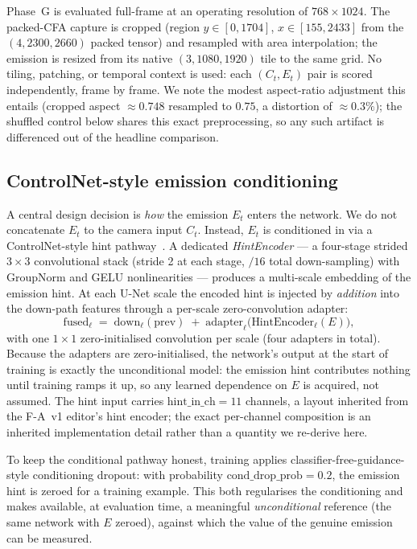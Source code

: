 Phase~G is evaluated full-frame at an operating resolution of $768\times1024$. The packed-CFA capture is cropped (region $y\in[0,1704]$, $x\in[155,2433]$ from the $(4,2300,2660)$ packed tensor) and resampled with area interpolation; the emission is resized from its native $(3,1080,1920)$ tile to the same grid. No tiling, patching, or temporal context is used: each $(C_t,E_t)$ pair is scored independently, frame by frame. We note the modest aspect-ratio adjustment this entails (cropped aspect $\approx 0.748$ resampled to $0.75$, a distortion of $\approx 0.3\%$); the shuffled control below shares this exact preprocessing, so any such artifact is differenced out of the headline comparison.

\subsection{ControlNet-style emission conditioning}

A central design decision is \emph{how} the emission $E_t$ enters the network. We do not concatenate $E_t$ to the camera input $C_t$. Instead, $E_t$ is conditioned in via a ControlNet-style hint pathway~\cite{zhang2023controlnet}. A dedicated \emph{HintEncoder} --- a four-stage strided $3\times3$ convolutional stack (stride 2 at each stage, $/16$ total down-sampling) with GroupNorm and GELU nonlinearities --- produces a multi-scale embedding of the emission hint. At each U-Net scale the encoded hint is injected by \emph{addition} into the down-path features through a per-scale zero-convolution adapter:
\[
\text{fused}_\ell \;=\; \text{down}_\ell(\text{prev}) \;+\; \text{adapter}_\ell\!\big(\text{HintEncoder}_\ell(E)\big),
\]
with one $1\times1$ zero-initialised convolution per scale (four adapters in total). Because the adapters are zero-initialised, the network's output at the start of training is exactly the unconditional model: the emission hint contributes nothing until training ramps it up, so any learned dependence on $E$ is acquired, not assumed. The hint input carries $\text{hint\_in\_ch}=11$ channels, a layout inherited from the F-A~v1 editor's hint encoder; the exact per-channel composition is an inherited implementation detail rather than a quantity we re-derive here.

To keep the conditional pathway honest, training applies classifier-free-guidance-style conditioning dropout: with probability $\text{cond\_drop\_prob}=0.2$, the emission hint is zeroed for a training example. This both regularises the conditioning and makes available, at evaluation time, a meaningful \emph{unconditional} reference (the same network with $E$ zeroed), against which the value of the genuine emission can be measured.

